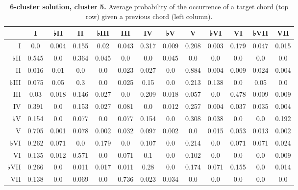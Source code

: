 \begin{table}[htbp]
\begin{minipage}{\linewidth}
\setlength{\tymax}{0.5\linewidth}
\centering
\small
\caption{\textbf{6-cluster solution, cluster 5.} Average probability of the occurrence of a target chord (top row) given a previous chord (left column).}
\label{6-clustersolutioncluster5.averageprobabilityoftheoccurrenceofatargetchordtoprowgivenapreviouschordleftcolumn.}
\begin{tabulary}{\textwidth}{@{}RCCCCCCCCCCCC@{}} \toprule
&I&♭II&II&♭III&III&IV&♭V&V&♭VI&VI&♭VII&VII\\
\midrule
I&0.0&0.004&0.155&0.02&0.043&0.317&0.009&0.208&0.003&0.179&0.047&0.015\\
♭II&0.545&0.0&0.364&0.045&0.0&0.0&0.045&0.0&0.0&0.0&0.0&0.0\\
II&0.016&0.01&0.0&0.0&0.023&0.027&0.0&0.884&0.004&0.009&0.024&0.004\\
♭III&0.075&0.05&0.3&0.0&0.025&0.15&0.0&0.213&0.138&0.0&0.05&0.0\\
III&0.03&0.018&0.146&0.027&0.0&0.209&0.018&0.057&0.0&0.478&0.009&0.009\\
IV&0.391&0.0&0.153&0.027&0.081&0.0&0.012&0.257&0.004&0.037&0.035&0.004\\
♭V&0.154&0.0&0.077&0.0&0.077&0.154&0.0&0.308&0.038&0.0&0.0&0.192\\
V&0.705&0.001&0.078&0.002&0.032&0.097&0.002&0.0&0.015&0.053&0.013&0.002\\
♭VI&0.262&0.071&0.0&0.179&0.0&0.107&0.0&0.214&0.0&0.071&0.071&0.024\\
VI&0.135&0.012&0.571&0.0&0.071&0.1&0.0&0.102&0.0&0.0&0.0&0.009\\
♭VII&0.266&0.0&0.011&0.017&0.011&0.28&0.0&0.174&0.071&0.155&0.0&0.014\\
VII&0.138&0.0&0.069&0.0&0.736&0.023&0.034&0.0&0.0&0.0&0.0&0.0\\

\bottomrule

\end{tabulary}
\end{minipage}
\end{table}

